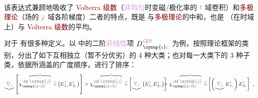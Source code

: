 \begin{subequations}
\begin{align}
\end{align}
\end{subequations}
该表达式兼顾地吸收了 \textcolor{Maroon}{Volterra 级数}（\textcolor{Plum}{非均匀}时变磁/极化率的 $\mathcolor{gray}{t}$ 域卷积）和\textcolor{Maroon}{多极理论}（场的 $\mathcolor{gray}{\bar{\rho}}$ 域各阶梯度）二者的特点，既是  与\textcolor{Maroon}{多极理论}的中和，也是 （在时域上）与 \textcolor{Maroon}{Volterra 级数}的平均。

对于  有很多种定义。以  中的二阶\textcolor{Plum}{非线性}项 $D^{\;\! \textcolor{Maroon}{(2)} \mathcolor{gray}{t}}_{\;\! \symup{\iota}\mathcolor{gray}{z}}$ 为例，按照理论框架的类别，分出了如下互相独立（暂不分优劣）的 4 种大类；也对每一大类下的 3 种子类，依据所涵盖的广度顺序，进行了排序：
\begin{subequations}
	\small
\begin{align}
	\mathcolor{gray}{\underbrace{\nabla_{\check{\jmath}}}} \left[ \chi^{\;\! \mathcolor{gray}{t} \hat{1} \hat{2} \;\! \mathcolor{gray}{\overbrace{\check{\symup{\jmath}}}}}_{\;\! \symup{\iota} \mathcolor{gray}{z} \textcolor{Maroon}{(2)}} ~\mathcolor{gray}{\widetilde \circledast} \left( E^{\;\!\mathcolor{gray}{t}}_{\;\! \hat{1} \mathcolor{gray}{z}} E^{\;\!\mathcolor{gray}{t}}_{\;\! \hat{2} \mathcolor{gray}{z}} \right) \right] &> \chi^{\;\! \mathcolor{gray}{t} \hat{1} \hat{2} \;\! \mathcolor{gray}{\overbrace{\check{\symup{\jmath}}}}}_{\;\! \symup{\iota} \mathcolor{gray}{z} \textcolor{Maroon}{(2)}} ~\mathcolor{gray}{\widetilde \circledast} \left[ \mathcolor{gray}{\underbrace{\nabla_{\check{\jmath}}}} \left( E^{\;\!\mathcolor{gray}{t}}_{\;\! \hat{1} \mathcolor{gray}{z}} E^{\;\!\mathcolor{gray}{t}}_{\;\! \hat{2} \mathcolor{gray}{z}} \right) \right] \hspace{-2em}&&> \chi^{\;\! \mathcolor{gray}{t} \hat{1} \hat{2} \;\! \mathcolor{gray}{\overbrace{\check{\symup{\jmath}}}}}_{\;\! \symup{\iota} \mathcolor{gray}{z} \textcolor{Maroon}{(2)}} ~\mathcolor{gray}{\widetilde \circledast} \left[ \left( \mathcolor{gray}{\underbrace{\nabla_{\check{\jmath}}}} E^{\;\!\mathcolor{gray}{t}}_{\;\! \hat{1} \mathcolor{gray}{z}} \right) E^{\;\!\mathcolor{gray}{t}}_{\;\! \hat{2} \mathcolor{gray}{z}} \right]~, \label{eq:Volterra} \\

\end{align}
\end{subequations}
